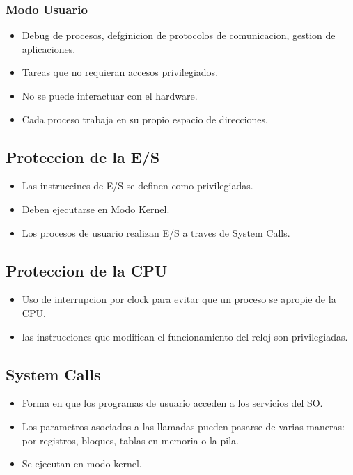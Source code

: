 \subsubsection{Modo Usuario}
\begin{itemize}
    \item Debug de procesos, defginicion de protocolos de comunicacion, gestion de aplicaciones.
    \item Tareas que no requieran accesos privilegiados.
    \item No se puede interactuar con el hardware.
    \item Cada proceso trabaja en su propio espacio de direcciones.
\end{itemize}

\subsection{Proteccion de la E/S}
\begin{itemize}
    \item Las instruccines de E/S se definen como privilegiadas.    
    \item Deben ejecutarse en Modo Kernel.
        \item Los procesos de usuario realizan E/S a traves de System Calls.
\end{itemize}

\subsection{Proteccion de la CPU}
\begin{itemize}
    \item Uso de interrupcion por clock para evitar que un proceso se apropie de la CPU.
    \item las instrucciones que modifican el funcionamiento del reloj son privilegiadas.
\end{itemize}



\subsection{System Calls}
\begin{itemize}
    \item Forma en que los programas de usuario acceden a los servicios del SO.
    \item Los parametros asociados a las llamadas pueden pasarse de varias maneras: por registros, bloques, tablas en memoria o la pila.
    \item Se ejecutan en modo kernel.
\end{itemize}

